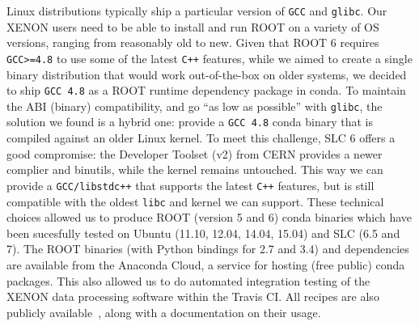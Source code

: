 \documentclass[a4paper]{jpconf}
\begin{document}
Linux distributions typically ship a particular version of \texttt{GCC} and \texttt{glibc}.
Our XENON users need to be able to install and run ROOT on a variety of OS versions, ranging from reasonably old to new.
Given that ROOT 6 requires \texttt{GCC>=4.8} to use some of the latest \texttt{C++} features, while we aimed to create a single binary distribution that would work 
out-of-the-box on older systems, we decided to ship \texttt{GCC 4.8} as a ROOT runtime dependency package in conda.
To maintain the ABI (binary) compatibility, and go ``as low as possible'' with \texttt{glibc}, the solution we found is a hybrid one: 
provide a \texttt{GCC 4.8} conda binary that is compiled against an older Linux kernel.
To meet this challenge, SLC 6 offers a good compromise: the Developer Toolset (v2) from CERN provides 
a newer complier and binutils, while the kernel remains untouched. This way we can provide a \texttt{GCC/libstdc++}
that supports the latest \texttt{C++} features, but is still compatible with the oldest \texttt{libc} and kernel we can support.
These technical choices allowed us to produce ROOT (version 5 and 6) conda binaries which have been sucesfully tested on Ubuntu (11.10, 12.04, 14.04, 15.04) and SLC (6.5 and 7).
The ROOT binaries (with Python bindings for 2.7 and 3.4) and dependencies are available from the Anaconda Cloud, a service for hosting (free public) conda packages.
This also allowed us to do automated integration testing of the XENON data processing software within the Travis CI.
All recipes are also publicly available~\cite{daniela_remenska_2016_47512}, along with a documentation on their usage.
\end{document}
